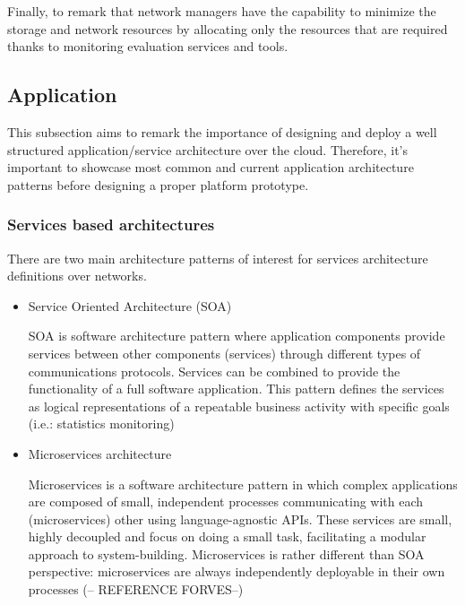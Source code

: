 Finally, to remark that network managers have the capability to minimize the storage and network resources by allocating only the resources that are required thanks to monitoring evaluation services and tools.

\subsection{Application}\label{SOA:coreService}

This subsection aims to remark the importance of designing and deploy a well structured application/service architecture over the cloud. Therefore, it's important to showcase most common and current application architecture patterns before designing a proper platform prototype.

\subsubsection{Services based architectures}\label{SOA:appArch}

There are two main architecture patterns of interest for services architecture definitions over networks. 

\begin{itemize}
\item Service Oriented Architecture (SOA) \hfill

SOA is software architecture pattern where application components provide services between other components (services) through different types of communications protocols. Services can be combined to provide the functionality of a full software application.
This pattern defines the services as logical representations of a repeatable business activity with specific goals (i.e.: statistics monitoring)

\item Microservices architecture \hfill

Microservices is a software architecture pattern in which complex applications are composed of small, independent processes communicating with each (microservices) other using language-agnostic APIs. These services are small, highly decoupled and focus on doing a small task, facilitating a modular approach to system-building. 
Microservices is rather different than SOA perspective: microservices are always independently deployable in their own processes  (-- REFERENCE FORVES--)

\end{itemize}

